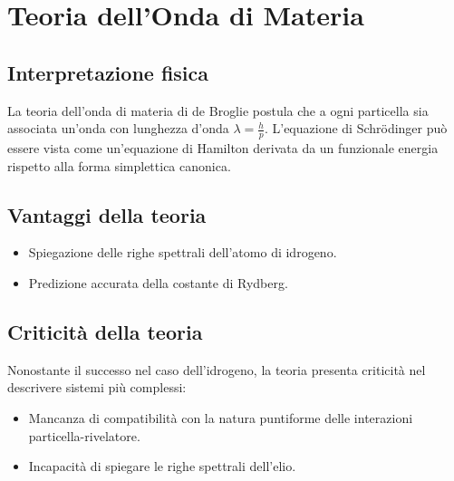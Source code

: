 \section{Teoria dell'Onda di Materia}
\subsection{Interpretazione fisica}
La teoria dell'onda di materia di de Broglie postula che a ogni particella sia associata un'onda con lunghezza d'onda $\lambda = \frac{h}{p}$. L'equazione di Schr\"odinger pu\`o essere vista come un'equazione di Hamilton derivata da un funzionale energia rispetto alla forma simplettica canonica.

\subsection{Vantaggi della teoria}
\begin{itemize}
    \item Spiegazione delle righe spettrali dell'atomo di idrogeno.
    \item Predizione accurata della costante di Rydberg.
\end{itemize}

\subsection{Criticit\`a della teoria}
Nonostante il successo nel caso dell'idrogeno, la teoria presenta criticit\`a nel descrivere sistemi pi\`u complessi:
\begin{itemize}
    \item Mancanza di compatibilit\`a con la natura puntiforme delle interazioni particella-rivelatore.
    \item Incapacit\`a di spiegare le righe spettrali dell'elio.
\end{itemize}